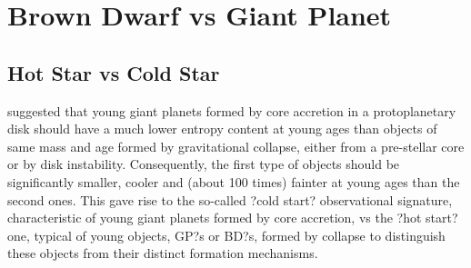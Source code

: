 \section{Brown Dwarf vs Giant Planet}
\label{sec:BDvsGP}
\subsection{Hot Star vs Cold Star}
\label{sec:hot_vs_cold}
\cite{Marley2007} suggested that young giant planets formed by core accretion in a protoplanetary disk should
have a much lower entropy content at young ages than objects of same mass and age formed by gravitational collapse, 
either from a pre-stellar core or by disk instability.
Consequently, the first type of objects should be significantly smaller, cooler and (about 100 times) fainter at young
ages than the second ones. This gave rise to the so-called ?cold start? observational signature, characteristic of young
giant planets formed by core accretion, vs the ?hot start? one, typical of young objects, GP?s or BD?s, formed by collapse
to distinguish these objects from their distinct formation mechanisms. 

